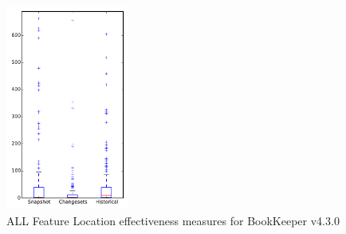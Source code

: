 
\begin{figure}[t]
\centering
\includegraphics[width=0.36\textwidth]{figures/flt/all_bookkeeper}
\caption{ALL Feature Location effectiveness measures for BookKeeper v4.3.0}
\label{fig:flt:all:bookkeeper}
\end{figure}

